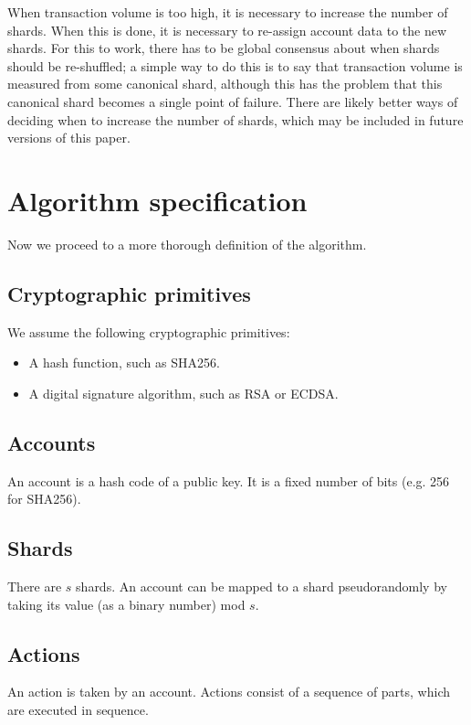 \documentclass{article}
\begin{document}
When transaction volume is too high, it is necessary to increase the number of
shards.  When this is done, it is necessary to re-assign account data to the
new shards.  For this to work, there has to be global consensus about when
shards should be re-shuffled; a simple way to do this is to say that
transaction volume is measured from some canonical shard, although this
has the problem that this canonical shard becomes a single point of failure.
There are likely better ways of deciding when to increase the number of shards,
which may be included in future versions of this paper.

\section{Algorithm specification}

Now we proceed to a more thorough definition of the algorithm.

\subsection{Cryptographic primitives}

We assume the following cryptographic primitives:

\begin{itemize}
  \item A hash function, such as SHA256.
  \item A digital signature algorithm, such as RSA or ECDSA.
\end{itemize}

\subsection{Accounts}

An account is a hash code of a public key.  It is a fixed number of bits (e.g. 256 for SHA256).

\subsection{Shards}

There are $s$ shards.  An account can be mapped to a shard pseudorandomly by taking its value (as a binary number) mod $s$.

\subsection{Actions}

An action is taken by an account.  Actions consist of a sequence of parts, which are executed in sequence.
\end{document}
